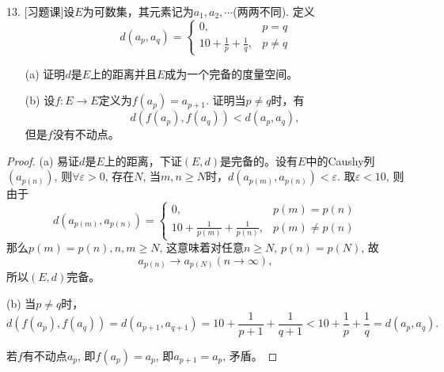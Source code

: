 \documentclass[a4paper,8pt]{ctexart}\textwidth 140mm \textheight 216mm
\newcommand{\e}{\varepsilon}
\newcommand{\8}{\infty}
\begin{document}
13. [习题课]设$E$为可数集，其元素记为$a_1,a_2,\cdots$(两两不同). 定义
\[d(a_p,a_q)=\begin{cases}
0, & p=q\\
10+\frac{1}{p}+\frac{1}{q}, & p\ne q
\end{cases}\]
\begin{enumerate}
	\item[(a)] 证明$d$是$E$上的距离并且$E$成为一个完备的度量空间。
	\item[(b)] 设$f:E\to E$定义为$f(a_p)=a_{p+1}$. 证明当$p\ne q$时，有
	$$d(f(a_p),f(a_q))<d(a_p,a_q),$$
	但是$f$没有不动点。
\end{enumerate}
\begin{proof}
	(a) 易证$d$是$E$上的距离，下证$(E,d)$是完备的。设有$E$中的Caushy列$(a_{p(n)})$, 则$\forall\e>0$, 存在$N$, 当$m,n\geq N$时，$d(a_{p(m)},a_{p(n)})<\e$. 取$\e<10$, 则由于
	\[d(a_{p(m)},a_{p(n)})=\begin{cases}
	0, & p(m)=p(n)\\
	10+\frac{1}{p(m)}+\frac{1}{p(n)}, & p(m)\ne p(n)
	\end{cases}\]
	那么$p(m)=p(n),n,m\geq N$, 这意味着对任意$n\geq N$, $p(n)=p(N)$, 故
	$$a_{p(n)}\to a_{p(N)}(n\to\infty),$$
	所以$(E,d)$完备。
	
	(b) 当$p\ne q$时，
	$$d(f(a_p),f(a_q))=d(a_{p+1},a_{q+1})=10+\frac{1}{p+1}+\frac{1}{q+1}<10+\frac{1}{p}+\frac{1}{q}=d(a_p,a_q).$$
	
	若$f$有不动点$a_p$, 即$f(a_p)=a_p$, 即$a_{p+1}=a_{p}$, 矛盾。
\end{proof}
\end{document}
